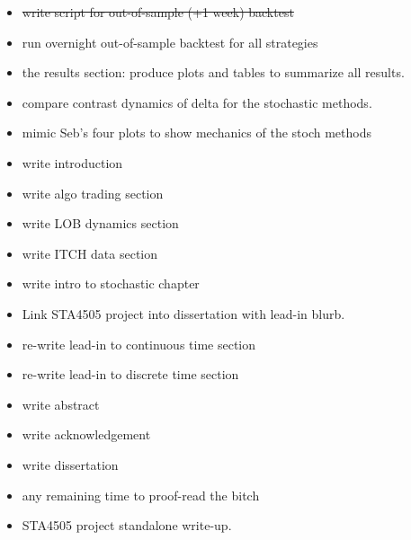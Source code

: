 \documentclass[12pt]{article}
\begin{document}
\begin{itemize}
\item \st{write script for out-of-sample (+1 week) backtest}
\item run overnight out-of-sample backtest for all strategies
\item the results section: produce plots and tables to summarize all results. 
\item compare contrast dynamics of delta for the stochastic methods.
\item mimic Seb's four plots to show mechanics of the stoch methods
\item write introduction
\item write algo trading section
\item write LOB dynamics section
\item write ITCH data section
\item write intro to stochastic chapter
\item Link STA4505 project into dissertation with lead-in blurb.
\item re-write lead-in to continuous time section
\item re-write lead-in to discrete time section
\item write abstract
\item write acknowledgement
\item write dissertation
\item any remaining time to proof-read the bitch
\item STA4505 project standalone write-up.
\end{itemize}
\end{document}

